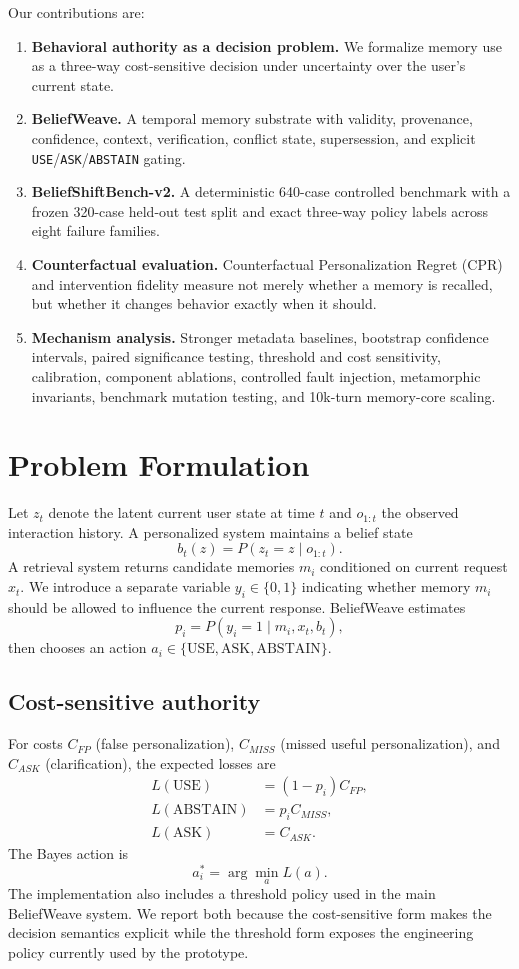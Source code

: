 \documentclass[10pt]{article}
\begin{document}
Our contributions are:
\begin{enumerate}
\item \textbf{Behavioral authority as a decision problem.} We formalize memory use as a three-way cost-sensitive decision under uncertainty over the user's current state.
\item \textbf{BeliefWeave.} A temporal memory substrate with validity, provenance, confidence, context, verification, conflict state, supersession, and explicit \texttt{USE}/\texttt{ASK}/\texttt{ABSTAIN} gating.
\item \textbf{BeliefShiftBench-v2.} A deterministic 640-case controlled benchmark with a frozen 320-case held-out test split and exact three-way policy labels across eight failure families.
\item \textbf{Counterfactual evaluation.} Counterfactual Personalization Regret (CPR) and intervention fidelity measure not merely whether a memory is recalled, but whether it changes behavior exactly when it should.
\item \textbf{Mechanism analysis.} Stronger metadata baselines, bootstrap confidence intervals, paired significance testing, threshold and cost sensitivity, calibration, component ablations, controlled fault injection, metamorphic invariants, benchmark mutation testing, and 10k-turn memory-core scaling.
\end{enumerate}

\section{Problem Formulation}
Let $z_t$ denote the latent current user state at time $t$ and $o_{1:t}$ the observed interaction history. A personalized system maintains a belief state
\[
 b_t(z)=P(z_t=z\mid o_{1:t}).
\]
A retrieval system returns candidate memories $m_i$ conditioned on current request $x_t$. We introduce a separate variable $y_i\in\{0,1\}$ indicating whether memory $m_i$ should be allowed to influence the current response. BeliefWeave estimates
\[
 p_i=P(y_i=1\mid m_i,x_t,b_t),
\]
then chooses an action $a_i\in\{\mathrm{USE},\mathrm{ASK},\mathrm{ABSTAIN}\}$.

\subsection{Cost-sensitive authority}
For costs $C_{FP}$ (false personalization), $C_{MISS}$ (missed useful personalization), and $C_{ASK}$ (clarification), the expected losses are
\begin{align*}
L(\mathrm{USE}) &= (1-p_i)C_{FP},\\
L(\mathrm{ABSTAIN}) &= p_i C_{MISS},\\
L(\mathrm{ASK}) &= C_{ASK}.
\end{align*}
The Bayes action is
\[
 a_i^*=\arg\min_a L(a).
\]
The implementation also includes a threshold policy used in the main BeliefWeave system. We report both because the cost-sensitive form makes the decision semantics explicit while the threshold form exposes the engineering policy currently used by the prototype.
\end{document}
